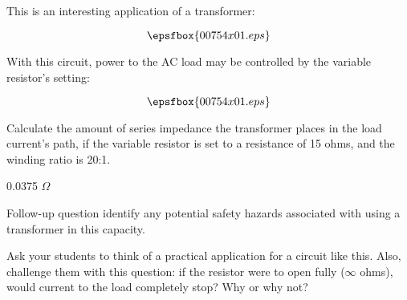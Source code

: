 

This is an interesting application of a transformer: 

$$\epsfbox{00754x01.eps}$$

With this circuit, power to the AC load may be controlled by the variable resistor's setting:

$$\epsfbox{00754x01.eps}$$

Calculate the amount of series impedance the transformer places in the load current's path, if the variable resistor is set to a resistance of 15 ohms, and the winding ratio is 20:1.







0.0375 $\Omega$

\vskip 10pt

Follow-up question identify any potential safety hazards associated with using a transformer in this capacity.







Ask your students to think of a practical application for a circuit like this.  Also, challenge them with this question: if the resistor were to open fully ($\infty$ ohms), would current to the load completely stop?  Why or why not?




